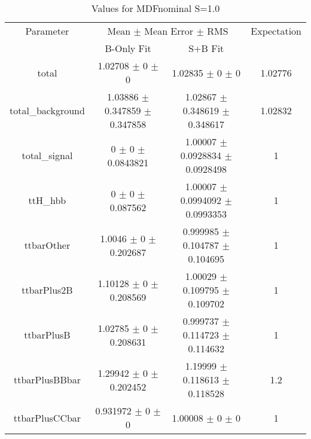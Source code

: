 \begin{table}
\centering
\caption{Values for MDFnominal S=1.0}
\begin{tabular}{cccc}
\toprule
Parameter & \multicolumn{2}{c}{Mean $\pm$ Mean Error $\pm$ RMS} & Expectation\\
 & B-Only Fit & S+B Fit & \\
\midrule
total & \num{1.02708} $\pm$ \num{0} $\pm$ \num{0} & \num{1.02835} $\pm$ \num{0} $\pm$ \num{0} & \num{1.02776}\\
total\_background & \num{1.03886} $\pm$ \num{0.347859} $\pm$ \num{0.347858} & \num{1.02867} $\pm$ \num{0.348619} $\pm$ \num{0.348617} & \num{1.02832}\\
total\_signal & \num{0} $\pm$ \num{0} $\pm$ \num{0.0843821} & \num{1.00007} $\pm$ \num{0.0928834} $\pm$ \num{0.0928498} & \num{1}\\
ttH\_hbb & \num{0} $\pm$ \num{0} $\pm$ \num{0.087562} & \num{1.00007} $\pm$ \num{0.0994092} $\pm$ \num{0.0993353} & \num{1}\\
ttbarOther & \num{1.0046} $\pm$ \num{0} $\pm$ \num{0.202687} & \num{0.999985} $\pm$ \num{0.104787} $\pm$ \num{0.104695} & \num{1}\\
ttbarPlus2B & \num{1.10128} $\pm$ \num{0} $\pm$ \num{0.208569} & \num{1.00029} $\pm$ \num{0.109795} $\pm$ \num{0.109702} & \num{1}\\
ttbarPlusB & \num{1.02785} $\pm$ \num{0} $\pm$ \num{0.208631} & \num{0.999737} $\pm$ \num{0.114723} $\pm$ \num{0.114632} & \num{1}\\
ttbarPlusBBbar & \num{1.29942} $\pm$ \num{0} $\pm$ \num{0.202452} & \num{1.19999} $\pm$ \num{0.118613} $\pm$ \num{0.118528} & \num{1.2}\\
ttbarPlusCCbar & \num{0.931972} $\pm$ \num{0} $\pm$ \num{0} & \num{1.00008} $\pm$ \num{0} $\pm$ \num{0} & \num{1}\\
\bottomrule
\end{tabular}
\end{table}